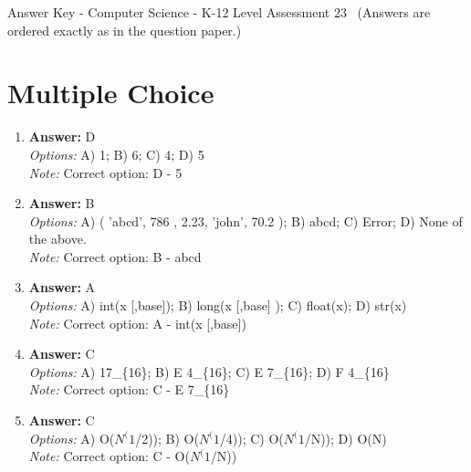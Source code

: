 \documentclass[12pt]{article}
\begin{document}
\begin{center}
Answer Key - Computer Science - K-12 Level Assessment 23 \
\small (Answers are ordered exactly as in the question paper.)
\end{center}

\section*{Multiple Choice}
\begin{enumerate}[label=\arabic*.]
\item \textbf{Answer:} D
\\ \textit{Options:} A) 1; B) 6; C) 4; D) 5
\\ \textit{Note:} Correct option: D - 5
\item \textbf{Answer:} B
\\ \textit{Options:} A) ( 'abcd', 786 , 2.23, 'john', 70.2 ); B) abcd; C) Error; D) None of the above.
\\ \textit{Note:} Correct option: B - abcd
\item \textbf{Answer:} A
\\ \textit{Options:} A) int(x [,base]); B) long(x [,base] ); C) float(x); D) str(x)
\\ \textit{Note:} Correct option: A - int(x [,base])
\item \textbf{Answer:} C
\\ \textit{Options:} A) 17\_\{16\}; B) E 4\_\{16\}; C) E 7\_\{16\}; D) F 4\_\{16\}
\\ \textit{Note:} Correct option: C - E 7\_\{16\}
\item \textbf{Answer:} C
\\ \textit{Options:} A) O($N^(1$/2)); B) O($N^(1$/4)); C) O($N^(1$/N)); D) O(N)
\\ \textit{Note:} Correct option: C - O($N^(1$/N))
\end{enumerate}
\end{document}
